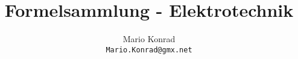 \documentclass[10pt,a4paper,oneside]{article}
\begin{document}
\title{Formelsammlung - Elektrotechnik}
\author{Mario Konrad\\\texttt{Mario.Konrad@gmx.net}}
\maketitle

\tableofcontents


\end{document}
